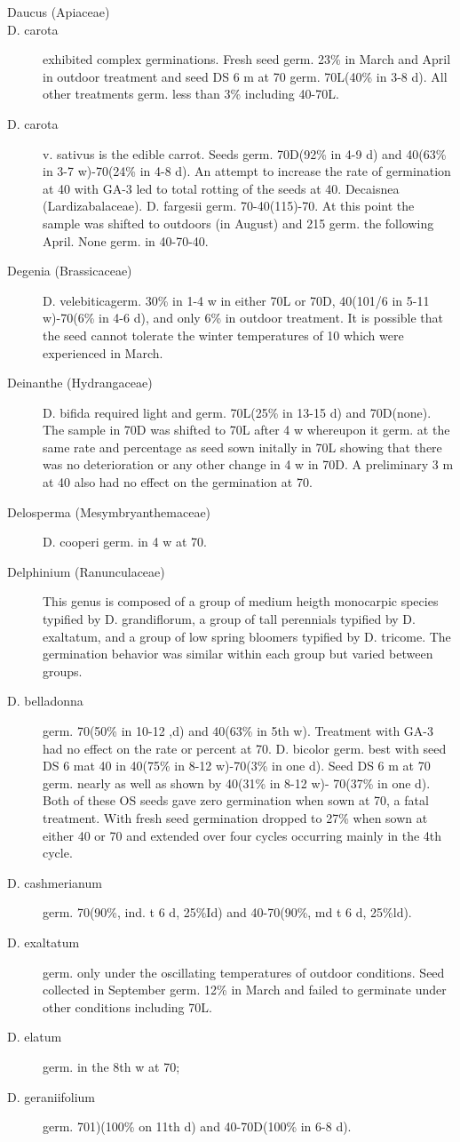 \begin{description}
\item[Daucus (Apiaceae)]
\item[D. carota] exhibited complex germinations. Fresh seed germ. 23\% in March and
April in outdoor treatment and seed DS 6 m at 70 germ. 70L(40\% in 3-8 d). All other
treatments germ. less than 3\% including 40-70L.
\item[D. carota] v. sativus is the edible carrot. Seeds germ. 70D(92\% in 4-9 d) and
40(63\% in 3-7 w)-70(24\% in 4-8 d). An attempt to increase the rate of germination at
40 with GA-3 led to total rotting of the seeds at 40.
Decaisnea (Lardizabalaceae). D. fargesii germ. 70-40(115)-70. At this
point the sample was shifted to outdoors (in August) and 215 germ. the following April.
None germ. in 40-70-40.

\item[Degenia (Brassicaceae)] D. velebiticagerm. 30\% in 1-4 w in either 70L or
70D, 40(101/6 in 5-11 w)-70(6\% in 4-6 d), and only 6\% in outdoor treatment. It is
possible that the seed cannot tolerate the winter temperatures of 10 which were
experienced in March.

\item[Deinanthe (Hydrangaceae)] D. bifida required light and germ. 70L(25\% in
13-15 d) and 70D(none). The sample in 70D was shifted to 70L after 4 w whereupon it
germ. at the same rate and percentage as seed sown initally in 70L showing that there
was no deterioration or any other change in 4 w in 70D. A preliminary 3 m at 40 also
had no effect on the germination at 70.

\item[Delosperma (Mesymbryanthemaceae)] D. cooperi germ. in 4 w at 70.
\item[Delphinium (Ranunculaceae)] This genus is composed of a group of
medium heigth monocarpic species typified by D. grandiflorum, a group of tall
perennials typified by D. exaltatum, and a group of low spring bloomers typified by D.
tricome. The germination behavior was similar within each group but varied between
groups.
\item[D. belladonna] germ. 70(50\% in 10-12 ,d) and 40(63\% in 5th w). Treatment with
GA-3 had no effect on the rate or percent at 70.
D. bicolor germ. best with seed DS 6 mat 40 in 40(75\% in 8-12 w)-70(3\% in
one d). Seed DS 6 m at 70 germ. nearly as well as shown by 40(31\% in 8-12 w)-
70(37\% in one d). Both of these OS seeds gave zero germination when sown at 70, a
fatal treatment. With fresh seed germination dropped to 27\% when sown at either 40
or 70 and extended over four cycles occurring mainly in the 4th cycle.
\item[D. cashmerianum] germ. 70(90\%, ind. t 6 d, 25\%Id) and 40-70(90\%, md t 6 d,
25\%ld).
\item[D. exaltatum] germ. only under the oscillating temperatures of outdoor
conditions. Seed collected in September germ. 12\% in March and failed to germinate
under other conditions including 70L.
\item[D. elatum] germ. in the 8th w at 70;
\item[D. geraniifolium] germ. 701)(100\% on 11th d) and 40-70D(100\% in 6-8 d).


\end{description}
